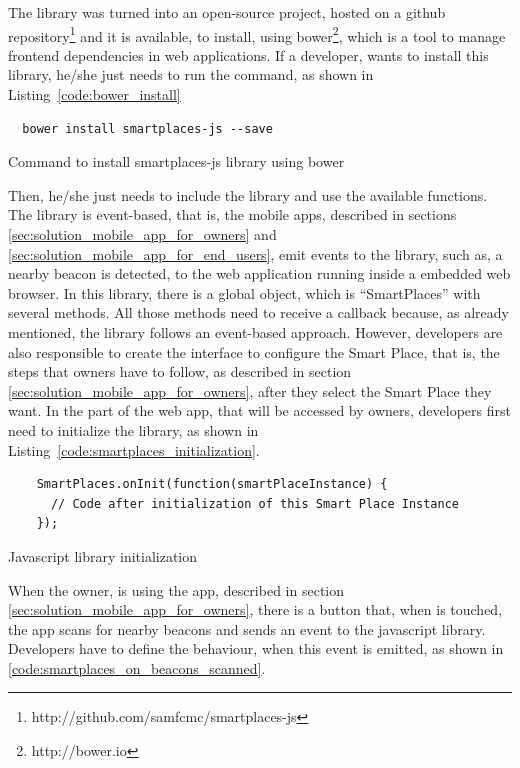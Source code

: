 The library was turned into an open-source project, hosted on a github repository\footnote{http://github.com/samfcmc/smartplaces-js} and it is available, to install, using bower\footnote{http://bower.io}, which is a tool to manage frontend dependencies in web applications.
If a developer, wants to install this library, he/she just needs to run the command, as shown in Listing~\ref{code:bower_install}

\begin{listing}[H]
  \begin{verbatim}
  bower install smartplaces-js --save
  \end{verbatim}
  \caption[Install library using Bower]{Command to install smartplaces-js library using bower}
  \label{code:bower_install}
\end{listing}
Then, he/she just needs to include the library and use the available functions.
The library is event-based, that is, the mobile apps, described in sections \ref{sec:solution_mobile_app_for_owners} and \ref{sec:solution_mobile_app_for_end_users}, emit events to the library, such as, a nearby beacon is detected, to the web application running inside a embedded web browser.
In this library, there is a global object, which is ``SmartPlaces'' with several methods.
All those methods need to receive a callback because, as already mentioned, the library follows an event-based approach.
However, developers are also responsible to create the interface to configure the Smart Place, that is, the steps that owners have to follow, as described in section \ref{sec:solution_mobile_app_for_owners}, after they select the Smart Place they want.
In the part of the web app, that will be accessed by owners, developers first need to initialize the library, as shown in Listing~\ref{code:smartplaces_initialization}.
\begin{listing}[H]
  \begin{verbatim}
    SmartPlaces.onInit(function(smartPlaceInstance) {
      // Code after initialization of this Smart Place Instance
    });
  \end{verbatim}
  \caption[Javascript library initialization]{Javascript library initialization}
  \label{code:smartplaces_initialization}
\end{listing}

When the owner, is using the app, described in section \ref{sec:solution_mobile_app_for_owners}, there is a button that, when is touched, the app scans for nearby beacons and sends an event to the javascript library.
Developers have to define the behaviour, when this event is emitted, as shown in \ref{code:smartplaces_on_beacons_scanned}.

